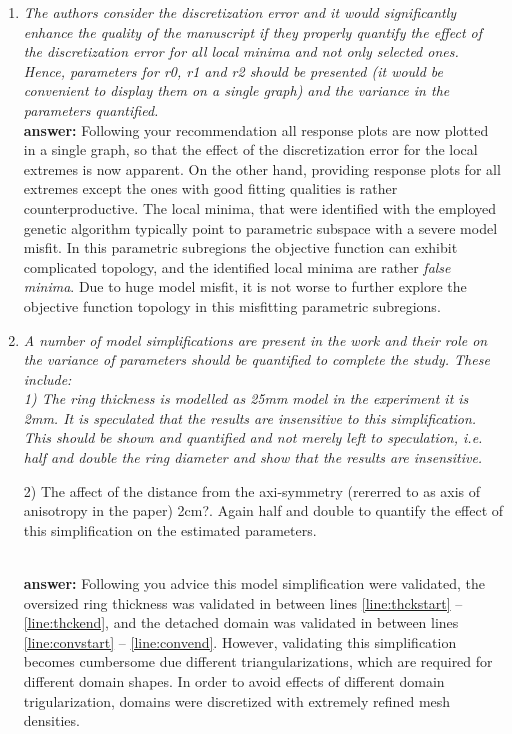 \documentclass[final,3p]{elsarticle}
\begin{document}
\begin{enumerate}[label={\bf \Roman*}]
\item {\it  The authors consider the discretization error and it would significantly enhance the quality of the manuscript if they properly quantify the effect of the discretization error for all local minima and not only selected ones. Hence, parameters for r0, r1 and r2 should be presented (it would be convenient to display them on a single graph) and the variance in the parameters quantified.} \\ 
{\bf answer:} Following your recommendation all response plots are now plotted in a single graph, so that the effect of the discretization error for the local extremes is now apparent. On the other hand, providing response plots for all extremes except the ones with good fitting qualities is rather counterproductive. The local minima, that were identified with the employed genetic algorithm typically point to parametric subspace with a severe model misfit. In this parametric subregions the objective function can exhibit complicated topology, and the identified local minima are rather  {\it false minima}. Due to huge model misfit, it is not worse to further explore the objective function topology in this misfitting parametric subregions.

\item {\it  A number of model simplifications are present in the work and their role on the variance of parameters should be quantified to complete the study. These include: \\

 1) The ring thickness is modelled as 25mm model in the experiment it is 2mm. It is speculated that the results are insensitive to this simplification. This should be shown and quantified and not merely left to speculation, i.e. half and double the ring diameter and show that the results are insensitive.


 2) The affect of the distance from the axi-symmetry (rererred to as axis of anisotropy in the paper) 2cm?. Again half and double to quantify the effect of this simplification on the estimated parameters.} \\
 {\bf answer:} Following you advice this model simplification were validated, the oversized ring thickness was validated in between lines \ref{line:thckstart} -- \ref{line:thckend}, and the detached domain was validated in between lines \ref{line:convstart} -- \ref{line:convend}.  However, validating this simplification becomes cumbersome due different triangularizations, which are required for different domain shapes.  In order to avoid effects of different domain trigularization, domains were discretized with extremely refined mesh densities.



\end{enumerate}
\end{document}
